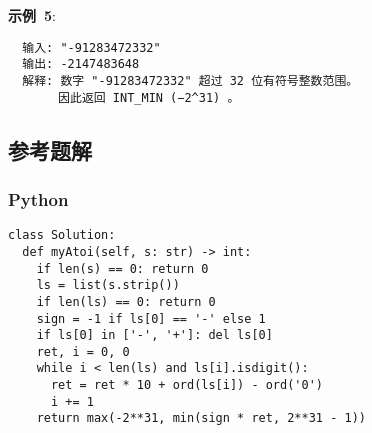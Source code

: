 \textbf{示例 5}:

\begin{verbatim}
  输入: "-91283472332"
  输出: -2147483648
  解释: 数字 "-91283472332" 超过 32 位有符号整数范围。
       因此返回 INT_MIN (−2^31) 。
\end{verbatim}

\subsection{参考题解}

\subsubsection{Python}

\begin{verbatim}
class Solution:
  def myAtoi(self, s: str) -> int:
    if len(s) == 0: return 0
    ls = list(s.strip())
    if len(ls) == 0: return 0
    sign = -1 if ls[0] == '-' else 1
    if ls[0] in ['-', '+']: del ls[0]
    ret, i = 0, 0
    while i < len(ls) and ls[i].isdigit():
      ret = ret * 10 + ord(ls[i]) - ord('0')
      i += 1
    return max(-2**31, min(sign * ret, 2**31 - 1))
\end{verbatim}
